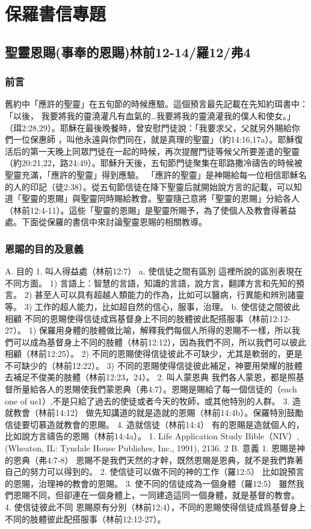 \section{保羅書信專題}

\subsection{聖靈恩賜(事奉的恩賜)林前12-14/羅12/弗4}


\subsubsection{前言}
舊約中「應許的聖靈」在五旬節的時候應驗。這個預言最先記載在先知約珥書中：「以後， 我要將我的靈澆灌凡有血氣的…我要將我的靈澆灌我的僕人和使女。」（珥2:28,29）。耶穌在最後晚餐時，曾安慰門徒說：「我要求父，父就另外賜給你們一位保惠師 ，叫他永遠與你們同在，就是真理的聖靈」（約14:16,17a）。耶穌復活后的第一天晚上同眾門徒在一起的時候，再次提醒門徒等候父所要差遣的聖靈（約20:21,22，路24:49）。耶穌升天後，五旬節門徒聚集在耶路撒冷禱告的時候被聖靈充滿，「應許的聖靈」得到應驗。 「應許的聖靈」是神賜給每一位相信耶穌名的人的印記（徒2:38）。從五旬節信徒在降下聖靈后就開始說方言的記載，可以知道「聖靈的恩賜」與聖靈同時賜給教會。聖靈隨己意將「聖靈的恩賜」分給各人（林前12:4-11）。這些「聖靈的恩賜」是聖靈所賜予，為了使個人及教會得著益處。下面從保羅的書信中來討論聖靈恩賜的相關教導。
\subsubsection{恩賜的目的及意義}
A. 目的
1. 叫人得益處（林前12:7）
a. 使信徒之間有區別 這裡所說的區別表現在不同方面。 1) 言語上：智慧的言語，知識的言語，說方言，翻譯方言和先知的預言。 2) 甚至人可以具有超越人類能力的作為，比如可以醫病，行異能和辨別諸靈等。 3) 工作的超人能力，比如超自然的信心，服事，治理。 b. 使信徒之間彼此相顧 不同的恩賜使得信徒成爲基督身上不同的肢體彼此配搭服事（林前12:12-27）。 1) 保羅用身體的肢體做比喻，解釋我們每個人所得的恩賜不一樣，所以我們可以成為基督身上不同的肢體（林前12:12），因為我們不同，所以我們可以彼此相顧（林前12:25）。 2) 不同的恩賜使得信徒彼此不可缺少，尤其是軟弱的，更是不可缺少的（林前12:22）。 3) 不同的恩賜使得信徒彼此補足，神要用榮耀的肢體去補足不俊美的肢體（林前12:23，24）。 2. 叫人蒙恩典 我們各人蒙恩，都是照基督所量給各人的恩賜使我們蒙恩典（弗4:7）。恩賜是賜給了每一個信徒的（each one of us1）,不是只給了過去的使徒或者今天的牧師，或其他特別的人群。 3. 造就教會（林前14:12） 做先知講道的就是造就的恩賜（林前14:4b）。保羅特別鼓勵信徒要切慕造就教會的恩賜。 4. 造就信徒（林前14:4） 有的恩賜是造就個人的，比如說方言禱告的恩賜（林前14:4a）。
1. Life Application Study Bible（NIV）, (Wheaton, IL: Tyndale House Publishes, Inc., 1991), 2136.
2
B. 意義
1. 恩賜是神的恩典（弗4:7-8）
恩賜不是我們天然的才幹，既然恩賜是恩典，就不是我們靠著自己的努力可以得到的。
2. 使信徒可以做不同的神的工作（羅12:5）
比如說預言的恩賜，治理神的教會的恩賜。
3. 使不同的信徒成為一個身體（羅12:5）
雖然我們恩賜不同，但卻連在一個身體上，一同建造這同一個身體，就是基督的教會。
4. 使信徒彼此不同
恩賜原有分別（林前12:4），不同的恩賜使得信徒成爲基督身上不同的肢體彼此配搭服事（林前12:12-27）。
